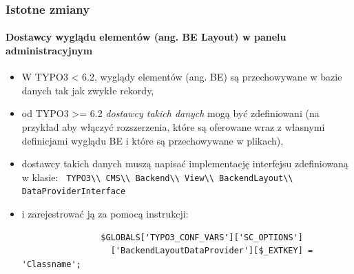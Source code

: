 
\begin{frame}[fragile]
	\frametitle{Istotne zmiany}
	\framesubtitle{Dostawcy wyglądu elementów (ang. BE Layout) w panelu administracyjnym}

	\begin{itemize}
		\item W TYPO3 < 6.2, wyglądy elementów (ang. BE) są przechowywane w bazie danych tak jak zwykłe rekordy,
		\item od TYPO3 >= 6.2 \emph{dostawcy takich danych} mogą być zdefiniowani\newline
			\small(na przykład aby włączyć rozszerzenia, które są oferowane wraz z własnymi definicjami wyglądu BE i które są przechowywane w plikach),\normalsize

		\item dostawcy takich danych muszą napisać implementację interfejsu zdefiniowaną w klasie:\newline
			\smaller\texttt{
				TYPO3\textbackslash\textbackslash
				CMS\textbackslash\textbackslash
				Backend\textbackslash\textbackslash
				View\textbackslash\textbackslash
				BackendLayout\textbackslash\textbackslash
				DataProviderInterface}\normalsize

		\item i zarejestrować ją za pomocą instrukcji:

			\begin{lstlisting}
				$GLOBALS['TYPO3_CONF_VARS']['SC_OPTIONS']
				  ['BackendLayoutDataProvider'][$_EXTKEY] = 'Classname';
			\end{lstlisting}


	\end{itemize}

\end{frame}


